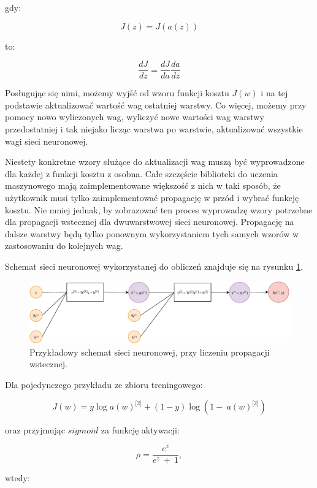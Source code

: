 gdy:

\[J\left( z \right) = J(a\left( z \right))\]

to:

\[\frac{dJ}{dz} = \frac{dJ}{da} \frac{da}{dz}\]

Posługując się nimi, możemy wyjść od wzoru funkcji kosztu \(J(w)\) i na tej podstawie aktualizować wartość wag ostatniej warstwy. Co więcej, możemy przy pomocy nowo wyliczonych wag, wyliczyć nowe wartości wag warstwy przedostatniej i tak niejako licząc warstwa po warstwie, aktualizować wszystkie wagi sieci neuronowej.

Niestety konkretne wzory służące do aktualizacji wag muszą być wyprowadzone dla każdej z funkcji kosztu z osobna. Całe szczęście biblioteki do uczenia maszynowego mają zaimplementowane większość z nich w taki sposób, że użytkownik musi tylko zaimplementować propagację w przód i wybrać funkcję kosztu. Nie mniej jednak, by zobrazować ten proces wyprowadzę wzory potrzebne dla propagacji wstecznej dla dwuwarstwowej sieci neuronowej. Propagację na dalsze warstwy będą tylko ponownym wykorzystaniem
tych samych wzorów w zastosowaniu do kolejnych wag.

Schemat sieci neuronowej wykorzystanej do obliczeń znajduje się na rysunku \ref{fig:backprop_fc}.

\begin{figure}[ht]
\centerline{\includegraphics[scale=0.7]{resources/fc/backprop_fc_cross_entropy.pdf}}
\caption{Przykładowy schemat sieci neuronowej, przy liczeniu propagacji
wstecznej.}
\label{fig:backprop_fc}
\end{figure}

Dla pojedynczego przykładu ze zbioru treningowego:

\[J\left( w \right) = y\log{a(w)^{\lbrack 2\rbrack} + \left( 1 - y \right)\log{(1 - \ a(w)^{\lbrack 2\rbrack})}}\]

oraz przyjmując \(sigmoid\) za funkcję aktywacji:

\[\rho = \frac{e^{z}}{e^{z}\  + \ 1},\]

wtedy:

